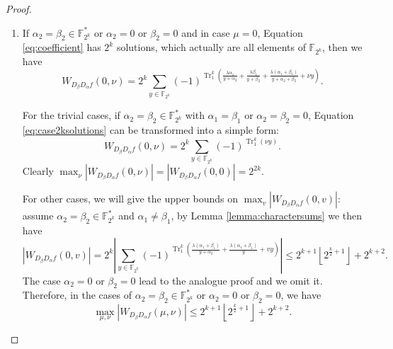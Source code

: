 \documentclass{article}
\newcommand{\F}{\mathbb{F}}
\newcommand{\0}{\textbf{0}}
\newcommand{\1}{\textbf{1}}
\newcommand{\TRACE}{\operatorname{Tr}_1^k}
\theoremstyle{plain}
\begin{document}
\begin{proof}
        \begin{enumerate}[label=\textbf{Case \arabic*},wide = 0pt]
            \item If $\alpha_2=\beta_2\in\F_{2^k}^*$ or $\alpha_2=0$ or $\beta_2=0$ and in case $\mu=0$, Equation \eqref{eq:coefficient} has $2^k$ solutions, which actually are all elements of $\F_{2^k}$, then we have 
            \begin{equation}\label{eq:case2ksolutions}
                W_{D_{\beta}D_{\alpha}f}(0,\nu)=2^k\sum_{y\in\F_{2^k}}(-1)^{\TRACE\left(\frac{\lambda\alpha_1}{y+\alpha_2}+\frac{\lambda\beta_1}{y+\beta_2}+\frac{\lambda(\alpha_1+\beta_1)}{y+\alpha_2+\beta_2}+\nu y\right)}.
            \end{equation}

            For the trivial cases, if $\alpha_2=\beta_2\in\F_{2^k}^*$ with $\alpha_1=\beta_1$ or $\alpha_2=\beta_2=0$, Equation \eqref{eq:case2ksolutions} can be transformed into a simple form:
            \[W_{D_{\beta}D_{\alpha}f}(0,\nu)=2^k\sum_{y\in\F_{2^k}}(-1)^{\TRACE\left(\nu y\right)}.\]
            Clearly $\max_{\nu}|W_{D_{\beta}D_{\alpha}f}(0,\nu)|=|W_{D_{\beta}D_{\alpha}f}(0,0)|=2^{2k}$.

            For other cases, we will give the upper bounds on $\max_{v}|W_{D_{\beta}D_{\alpha}f}(0,v)|$: 
            assume $\alpha_2=\beta_2\in\F_{2^k}^*$ and $\alpha_1\ne\beta_1$, by Lemma \ref{lemma:charactersums} we then have 
            \[\left\lvert W_{D_{\beta}D_{\alpha}f}(0,v)\right\rvert =2^k\left\lvert \sum_{y\in\F_{2^k}}(-1)^{\TRACE\left(\frac{\lambda(\alpha_1+\beta_1)}{y+\alpha_2}+\frac{\lambda(\alpha_1+\beta_1)}{y}+vy\right)}\right\rvert\le 2^{k+1}\left\lfloor 2^{\frac{k}{2}+1}\right\rfloor+2^{k+2}.\]
            The case $\alpha_2=0$ or $\beta_2=0$ lead to the analogue proof and we omit it. 
            Therefore, in the cases of $\alpha_2=\beta_2\in\F_{2^k}^*$ or $\alpha_2=0$ or $\beta_2=0$, we have 
            \[\max_{\mu,\nu}|W_{D_{\beta}D_{\alpha}f}(\mu,\nu)|\le 2^{k+1}\left\lfloor 2^{\frac{k}{2}+1}\right\rfloor+2^{k+2}.\]


\end{enumerate}
\end{proof}
\end{document}

